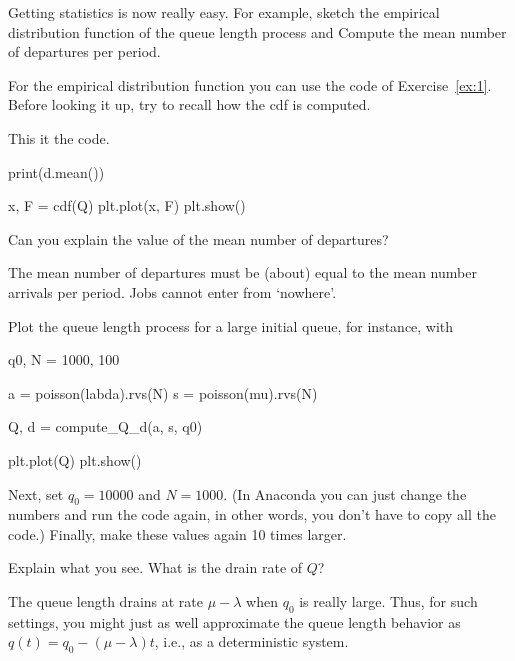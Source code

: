 \begin{exercise}
  Getting statistics is now really easy. For example,  sketch the empirical distribution function of the queue length process and Compute the mean number of departures per period.
  \begin{hint}
For  the empirical distribution function  you can use the code of Exercise~\ref{ex:1}. Before looking it up, try to recall how the cdf is computed.
  \end{hint}


  \begin{solution}
This it the code.    
  \begin{pyverbatim}
print(d.mean())
    
x, F = cdf(Q)
plt.plot(x, F)
plt.show()
  \end{pyverbatim}
  \end{solution}
\end{exercise}

\begin{exercise}
  Can you explain the value of the mean number of departures?
  \begin{solution}
    The mean number of departures must  be (about) equal  to the mean number arrivals per period. Jobs cannot enter from `nowhere'.
  \end{solution}
\end{exercise}


\begin{exercise}
Plot the queue length process for a large initial queue, for instance, with

\begin{pyverbatim}
q0, N = 1000, 100

a = poisson(labda).rvs(N)
s = poisson(mu).rvs(N)

Q, d = compute_Q_d(a, s, q0)

plt.plot(Q)
plt.show()
  \end{pyverbatim}

Next, set $q_0=10000$ and $N=1000$.  (In Anaconda you can just change the numbers and run the code again, in other words, you don't have to copy all the code.) Finally,  make these values again 10 times larger. 

Explain what you see. What is the drain rate of $Q$?
\begin{solution}
  The queue length drains at rate $\mu-\lambda$ when $q_0$ is really large. Thus, for such settings, you might just as well approximate the queue length behavior as $q(t) = q_0 - (\mu-\lambda)t$, i.e., as a deterministic system.
\end{solution}
\end{exercise}

